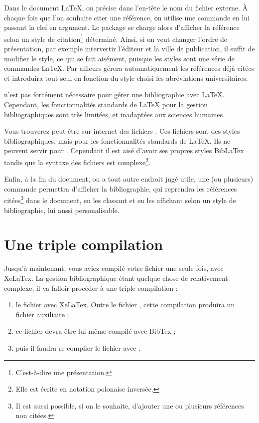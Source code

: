 Dans le document \LaTeX{}, on précise dans l'en-tête le nom du fichier externe. À chaque fois que l'on souhaite citer une référence, οn utilise une commande en lui passant la clef en argument. Le package  se charge alors d'afficher la référence selon un style de citation\footnote{C’est-à-dire une présentation.} déterminé. Ainsi, si on veut changer l'ordre de présentation, par exemple intervertir l'éditeur et la ville de publication, il suffit de modifier le style, ce qui se fait aisément, puisque les styles sont une série de commandes \LaTeX{}. Par ailleurs  gérera automatiquement les références déjà citées et introduira tout seul en fonction du style choisi les abréviations universitaires. 

\begin{anedocte}

 n'est pas forcément nécessaire pour gérer une bibliographie avec \LaTeX{}. Cependant, les fonctionnalités standards de LaTeX pour la gestion bibliographiques sont très limitées, et inadaptées aux sciences humaines. 

Vous trouverez peut-être sur internet des fichiers . Ces fichiers sont des styles bibliographiques, mais pour les fonctionnalités standards de \LaTeX{}. Ils ne peuvent servir pour . Cependant il est aisé d'avoir ses propres styles BibLaTex tandis que la syntaxe des fichiers \ext{} est complexe\footnote{Elle est écrite en notation polonaise inversée.}.

\end{anedocte}

Enfin, à la fin du document, ou a tout autre endroit jugé utile, une (ou plusieurs) commande permettra d'afficher la bibliographie, qui reprendra les références citées\footnote{Il est aussi possible, si on le souhaite, d'ajouter une ou plusieurs références non citées.} dans le document, en les classant et en les affichant selon un style de bibliographie, lui aussi personalisable.

\section{Une triple compilation}

Jusqu'à maintenant, vous aviez compilé votre fichier  une seule fois, avec XeLaTex. La gestion bibliographique étant quelque chose de relativement complexe, il va falloir procéder à une triple compilation :
\begin{enumerate}
\item le fichier  avec XeLaTex. Outre le fichier , cette compilation produira un fichier auxiliaire  ;
\item ce fichier devra être lui même compilé avec BibTex ;
\item puis il faudra re-compiler le fichier  avec \XeLaTeX.
\end{enumerate}

